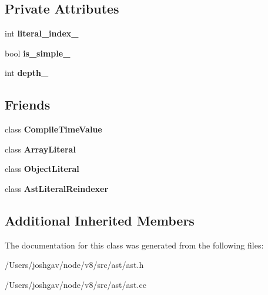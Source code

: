 \subsection*{Private Attributes}
\begin{DoxyCompactItemize}
\item 
int {\bfseries literal\+\_\+index\+\_\+}\hypertarget{classv8_1_1internal_1_1_materialized_literal_a08993046f89e5c976e7aa06d6c012701}{}\label{classv8_1_1internal_1_1_materialized_literal_a08993046f89e5c976e7aa06d6c012701}

\item 
bool {\bfseries is\+\_\+simple\+\_\+}\hypertarget{classv8_1_1internal_1_1_materialized_literal_a7bf57f754de460afb6572f1a33cce15c}{}\label{classv8_1_1internal_1_1_materialized_literal_a7bf57f754de460afb6572f1a33cce15c}

\item 
int {\bfseries depth\+\_\+}\hypertarget{classv8_1_1internal_1_1_materialized_literal_a3f5aeae90c1aa8733074c08e5c885cbe}{}\label{classv8_1_1internal_1_1_materialized_literal_a3f5aeae90c1aa8733074c08e5c885cbe}

\end{DoxyCompactItemize}
\subsection*{Friends}
\begin{DoxyCompactItemize}
\item 
class {\bfseries Compile\+Time\+Value}\hypertarget{classv8_1_1internal_1_1_materialized_literal_a8b5ce5782a366f51fd3ac3a2a7bbc54f}{}\label{classv8_1_1internal_1_1_materialized_literal_a8b5ce5782a366f51fd3ac3a2a7bbc54f}

\item 
class {\bfseries Array\+Literal}\hypertarget{classv8_1_1internal_1_1_materialized_literal_a13d34cc74ec8e17e3891f53066cbcd4e}{}\label{classv8_1_1internal_1_1_materialized_literal_a13d34cc74ec8e17e3891f53066cbcd4e}

\item 
class {\bfseries Object\+Literal}\hypertarget{classv8_1_1internal_1_1_materialized_literal_af53f5f0c57f02b72b3211be078d03c7d}{}\label{classv8_1_1internal_1_1_materialized_literal_af53f5f0c57f02b72b3211be078d03c7d}

\item 
class {\bfseries Ast\+Literal\+Reindexer}\hypertarget{classv8_1_1internal_1_1_materialized_literal_a2fd23c7396ed0a56a0e20e438c6a0338}{}\label{classv8_1_1internal_1_1_materialized_literal_a2fd23c7396ed0a56a0e20e438c6a0338}

\end{DoxyCompactItemize}
\subsection*{Additional Inherited Members}


The documentation for this class was generated from the following files\+:\begin{DoxyCompactItemize}
\item 
/\+Users/joshgav/node/v8/src/ast/ast.\+h\item 
/\+Users/joshgav/node/v8/src/ast/ast.\+cc\end{DoxyCompactItemize}
